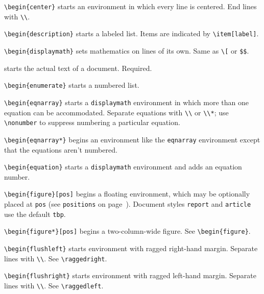 \verb"\begin{center}" starts an environment in which every line is centered.
	End lines with \verb"\\".

\verb"\begin{description}" starts a labeled list.  Items are
	indicated by \verb"\item[label]".

\verb"\begin{displaymath}" sets mathematics on lines of its own.
	Same as \verb"\[" or \verb"$$".

\verb"" starts the actual text of a document.  Required.

\verb"\begin{enumerate}" starts a numbered list.

\verb"\begin{eqnarray}" starts a \verb"displaymath" environment in which
	more than one equation can be accommodated.  Separate equations 
	with \verb"\\" or \verb"\\*"; use \verb"\nonumber" to suppress
	numbering a particular equation.

\verb"\begin{eqnarray*}" begins an environment like the \verb"eqnarray"
	environment except that the equations aren't numbered.

\verb"\begin{equation}" starts a \verb"displaymath" environment and adds
	an equation number.

\verb"\begin{figure}[pos]" begins a floating environment, which may be
	optionally placed at \verb"pos" (see \verb"positions" on
	page~\pageref{pos-ref}). Document styles \verb"report" and
	\verb"article" use the default \verb"tbp".

\verb"\begin{figure*}[pos]" begins a two-column-wide figure.
	See \verb"\begin{figure}".

\verb"\begin{flushleft}" starts environment with ragged right-hand margin.
	Separate lines with \verb"\\". See \verb"\raggedright".

\verb"\begin{flushright}" starts environment with ragged left-hand margin.
	Separate lines with \verb"\\". See \verb"\raggedleft".

